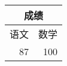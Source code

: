 \begin{tabular}{|r|r|}
  \hline
  \multicolumn{2}{|c|}{成绩} \\ \hline
  语文 & 数学 \\ \hline
  87 & 100 \\ \hline
\end{tabular}
